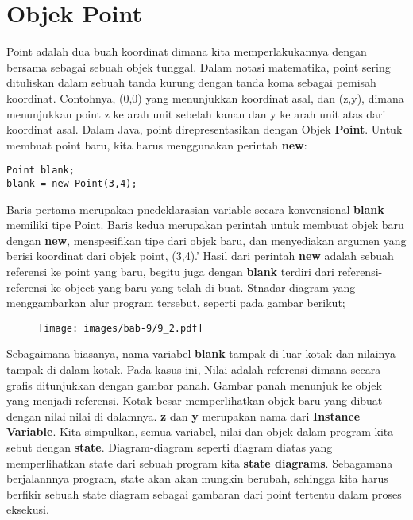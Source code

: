 \section{Objek Point}
Point adalah dua buah koordinat dimana kita memperlakukannya dengan bersama sebagai sebuah objek tunggal. Dalam notasi matematika, point sering dituliskan dalam sebuah tanda kurung dengan tanda koma sebagai pemisah koordinat. Contohnya, (0,0) yang menunjukkan koordinat asal, dan (z,y), dimana menunjukkan  point z ke arah unit sebelah kanan dan y ke arah unit atas dari koordinat asal.
Dalam Java, point direpresentasikan dengan Objek \textbf{Point}. Untuk membuat point baru, kita harus menggunakan perintah \textbf{new}:
\begin{lstlisting}
Point blank;
blank = new Point(3,4);
\end{lstlisting}
Baris pertama merupakan pnedeklarasian variable secara konvensional \textbf{blank} memiliki tipe Point.
Baris kedua merupakan perintah untuk membuat objek baru dengan \textbf{new}, menspesifikan tipe dari objek baru, dan menyediakan argumen yang berisi koordinat dari objek point, (3,4).'
Hasil dari perintah \textbf{new} adalah sebuah referensi ke point yang baru, begitu juga dengan \textbf{blank} terdiri dari referensi-referensi ke object yang baru yang telah di buat. Stnadar diagram yang menggambarkan alur program tersebut, seperti pada gambar berikut;

\begin{figure}[H]
	\centering \texttt{[image: images/bab-9/9\_2.pdf]}
\end{figure}

Sebagaimana biasanya, nama variabel \textbf{blank} tampak di luar kotak dan nilainya tampak di dalam kotak. Pada kasus ini, Nilai adalah referensi dimana secara grafis ditunjukkan dengan gambar panah. Gambar panah menunjuk ke objek yang menjadi referensi. 
Kotak besar memperlihatkan objek baru yang dibuat dengan nilai nilai di dalamnya. \textbf{z} dan \textbf{y} merupakan nama dari \textbf{Instance Variable}.
Kita simpulkan, semua variabel, nilai dan objek dalam program kita sebut dengan \textbf{state}. Diagram-diagram seperti diagram diatas yang memperlihatkan state dari sebuah program kita \textbf{state diagrams}. Sebagamana berjalannnya program, state akan akan mungkin berubah, sehingga kita harus berfikir sebuah state diagram sebagai gambaran dari point tertentu dalam proses eksekusi.


